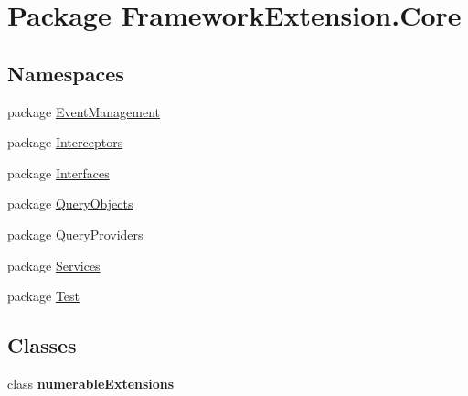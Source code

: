 \hypertarget{namespace_framework_extension_1_1_core}{\section{Package Framework\-Extension.\-Core}
\label{namespace_framework_extension_1_1_core}
}
\subsection*{Namespaces}
\begin{DoxyCompactItemize}
\item 
package \hyperlink{namespace_framework_extension_1_1_core_1_1_event_management}{Event\-Management}
\item 
package \hyperlink{namespace_framework_extension_1_1_core_1_1_interceptors}{Interceptors}
\item 
package \hyperlink{namespace_framework_extension_1_1_core_1_1_interfaces}{Interfaces}
\item 
package \hyperlink{namespace_framework_extension_1_1_core_1_1_query_objects}{Query\-Objects}
\item 
package \hyperlink{namespace_framework_extension_1_1_core_1_1_query_providers}{Query\-Providers}
\item 
package \hyperlink{namespace_framework_extension_1_1_core_1_1_services}{Services}
\item 
package \hyperlink{namespace_framework_extension_1_1_core_1_1_test}{Test}
\end{DoxyCompactItemize}
\subsection*{Classes}
\begin{DoxyCompactItemize}
\item 
class {\bfseries numerable\-Extensions}
\end{DoxyCompactItemize}
